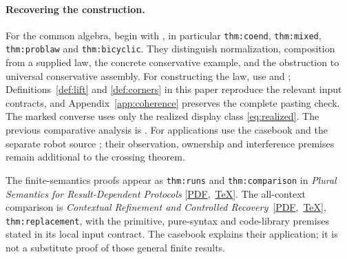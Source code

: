 \documentclass[11pt]{article}
\numberwithin{equation}{section}
\theoremstyle{definition}\newtheorem{definition}[theorem]{Definition}
\begin{document}
\paragraph{Recovering the construction.}
For the common algebra, begin with \cite{U}, in particular
\texttt{thm:coend}, \texttt{thm:mixed}, \texttt{thm:problaw} and
\texttt{thm:bicyclic}. They distinguish normalization, composition from a
supplied law, the concrete conservative example, and the obstruction to
universal conservative assembly. For constructing the law, use
\cite{Gluing} and \cite{O1}; Definitions~\ref{def:lift} and
\ref{def:corners} in this paper reproduce the relevant input contracts,
and Appendix~\ref{app:coherence} preserves the complete pasting check.
The marked converse uses only the realized display class
\eqref{eq:realized}. The previous comparative analysis is \cite{Comparison}.
For applications use the casebook \cite{Casebook} and the separate robot
source \cite{RobotTransactions}; their observation, ownership and
interference premises remain additional to the crossing theorem.

The finite-semantics proofs appear as \texttt{thm:runs} and \texttt{thm:comparison} in
\emph{Plural Semantics for Result-Dependent Protocols} \mbox{[\href{https://github.com/eternal-november/eos-research-programmes/blob/10e771644cfdf58c3d05e989e4b26cae7164c80a/projects/contextual-composition/protocols/plural-semantics/Plural_Semantics_for_Result_Dependent_Protocols.pdf}{PDF}, \href{https://github.com/eternal-november/eos-research-programmes/blob/10e771644cfdf58c3d05e989e4b26cae7164c80a/projects/contextual-composition/protocols/plural-semantics/Plural_Semantics_for_Result_Dependent_Protocols.tex}{TeX}]}.
The all-context comparison is
\emph{Contextual Refinement and Controlled Recovery}~\mbox{[\href{https://github.com/eternal-november/eos-research-programmes/blob/10e771644cfdf58c3d05e989e4b26cae7164c80a/projects/contextual-composition/protocols/refinement-recovery/Contextual_Refinement_and_Controlled_Recovery.pdf}{PDF}, \href{https://github.com/eternal-november/eos-research-programmes/blob/10e771644cfdf58c3d05e989e4b26cae7164c80a/projects/contextual-composition/protocols/refinement-recovery/Contextual_Refinement_and_Controlled_Recovery.tex}{TeX}]},
\texttt{thm:replacement}, with the primitive, pure-syntax and code-library
premises stated in its local input contract. The casebook explains their
application; it is not a substitute proof of those general finite results.
\end{document}
